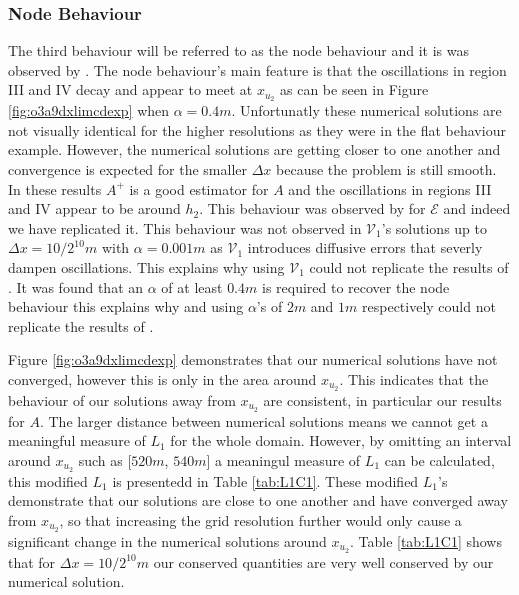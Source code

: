 \documentclass[times]{elsarticle}
\begin{document}
\subsubsection{Node Behaviour}
The third behaviour will be referred to as the node behaviour and it is was observed by \cite{El-etal-2006}. The node behaviour's main feature is that the oscillations in region III and IV decay and appear to meet at $x_{u_2}$ as can be seen in Figure \ref{fig:o3a9dxlimcdexp} when $\alpha = 0.4m$. Unfortunatly these numerical solutions are not visually identical for the higher resolutions as they were in the flat behaviour example. However, the numerical solutions are getting closer to one another and convergence is expected for the smaller $\Delta x$ because the problem is still smooth. In these results $A^+$ is a good estimator for $A$ and the oscillations in regions III and IV appear to be around $h_2$. This behaviour was observed by \cite{El-etal-2006} for $\mathcal{E}$ and indeed we have replicated it. This behaviour was not observed in $\mathcal{V}_1$'s solutions up to $\Delta x=10/2^{10}m$ with $\alpha=0.001m$ as $\mathcal{V}_1$ introduces diffusive errors that severly dampen oscillations. This explains why \cite{Hank-etal-2010-2034} using $\mathcal{V}_1$ could not replicate the results of \cite{El-etal-2006}. It was found that an $\alpha$ of at least $0.4m$ is required to recover the node behaviour this explains why \citet{Mitsotakis-etal-2014} and \citet{Mitsotakis-etal-2017} using $\alpha$'s of $2m$ and $1m$ respectively could not replicate the results of \citet{El-etal-2006}. 

Figure \ref{fig:o3a9dxlimcdexp} demonstrates that our numerical solutions have not converged, however this is only in the area around $x_{u_2}$. This indicates that the behaviour of our solutions away from $x_{u_2}$ are consistent, in particular our results for $A$. The larger distance between numerical solutions means we cannot get a meaningful measure of $L_1$ for the whole domain. However, by omitting an interval around $x_{u_2}$ such as [$520m$, $540m$] a meaningul measure of $L_1$ can be calculated, this modified $L_1$ is presentedd in Table \ref{tab:L1C1}. These modified $L_1$'s demonstrate that our solutions are close to one another and have converged away from $x_{u_2}$, so that increasing the grid resolution further would only cause a significant change in the numerical solutions around $x_{u_2}$. Table \ref{tab:L1C1} shows that for $\Delta x = 10/2^{10}m$ our conserved quantities are very well conserved by our numerical solution.
\end{document}
